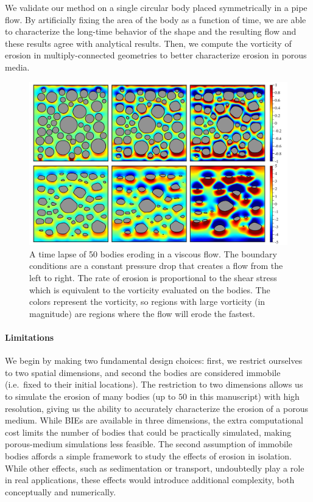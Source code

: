 \documentclass[preprint, 10pt]{elsarticle}
\begin{document}
We validate our method on a single circular body placed symmetrically in
a pipe flow.  By artificially fixing the area of the body as a function
of time, we are able to characterize the long-time behavior of the shape
and the resulting flow and these results agree with analytical results.
Then, we compute the vorticity of erosion in multiply-connected
geometries to better characterize erosion in porous media. 

\begin{figure}%
\begin{center}
\includegraphics[width = 0.9 \textwidth]{./figs/50bod.pdf}
\caption{\label{fig:50bodies} A time lapse of 50 bodies eroding in a
viscous flow.  The boundary conditions are a constant pressure drop that
creates a flow from the left to right.  The rate of erosion is
proportional to the shear stress which is equivalent to the vorticity
evaluated on the bodies.  The colors represent the vorticity, so regions
with large vorticity (in magnitude) are regions where the flow will
erode the fastest.}
\end{center}
\end{figure}




\paragraph{Limitations} 
We begin by making two fundamental design choices: first, we restrict ourselves to two spatial dimensions, and second the bodies are considered immobile (i.e.~fixed to their initial locations). The restriction to two dimensions allows us to simulate the erosion of many bodies (up to $50$ in this manuscript) with high resolution, giving us the ability to accurately characterize the erosion of a porous medium. While BIEs are available in three dimensions, the extra computational cost limits the number of bodies that could be practically simulated, making porous-medium simulations less feasible. The second assumption of immobile bodies affords a simple framework to study the effects of erosion in isolation. While other effects, such as sedimentation or transport, undoubtedly play a role in real applications, these effects would introduce additional complexity, both conceptually and numerically. 
\end{document}
